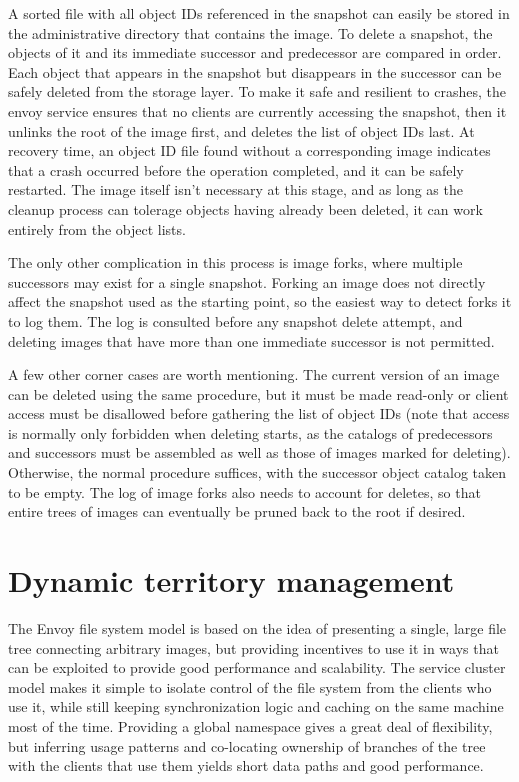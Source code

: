 A sorted file with all object IDs referenced in the snapshot can easily be stored in the administrative directory that contains the image. To delete a snapshot, the objects of it and its immediate successor and predecessor are compared in order. Each object that appears in the snapshot but disappears in the successor can be safely deleted from the storage layer. To make it safe and resilient to crashes, the envoy service ensures that no clients are currently accessing the snapshot, then it unlinks the root of the image first, and deletes the list of object IDs last. At recovery time, an object ID file found without a corresponding image indicates that a crash occurred before the operation completed, and it can be safely restarted. The image itself isn't necessary at this stage, and as long as the cleanup process can tolerage objects having already been deleted, it can work entirely from the object lists.

The only other complication in this process is image forks, where multiple successors may exist for a single snapshot. Forking an image does not directly affect the snapshot used as the starting point, so the easiest way to detect forks it to log them. The log is consulted before any snapshot delete attempt, and deleting images that have more than one immediate successor is not permitted.

A few other corner cases are worth mentioning. The current version of an image can be deleted using the same procedure, but it must be made read-only or client access must be disallowed before gathering the list of object IDs (note that access is normally only forbidden when deleting starts, as the catalogs of predecessors and successors must be assembled as well as those of images marked for deleting). Otherwise, the normal procedure suffices, with the successor object catalog taken to be empty. The log of image forks also needs to account for deletes, so that entire trees of images can eventually be pruned back to the root if desired.

\section{Dynamic territory management}

The Envoy file system model is based on the idea of presenting a single, large file tree connecting arbitrary images, but providing incentives to use it in ways that can be exploited to provide good performance and scalability. The service cluster model makes it simple to isolate control of the file system from the clients who use it, while still keeping synchronization logic and caching on the same machine most of the time. Providing a global namespace gives a great deal of flexibility, but inferring usage patterns and co-locating ownership of branches of the tree with the clients that use them yields short data paths and good performance.

